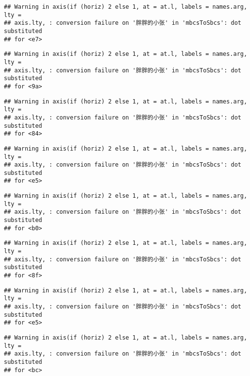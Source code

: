 \documentclass[
]{article}
\begin{document}
\begin{verbatim}
## Warning in axis(if (horiz) 2 else 1, at = at.l, labels = names.arg, lty =
## axis.lty, : conversion failure on '胖胖的小张' in 'mbcsToSbcs': dot substituted
## for <e7>
\end{verbatim}

\begin{verbatim}
## Warning in axis(if (horiz) 2 else 1, at = at.l, labels = names.arg, lty =
## axis.lty, : conversion failure on '胖胖的小张' in 'mbcsToSbcs': dot substituted
## for <9a>
\end{verbatim}

\begin{verbatim}
## Warning in axis(if (horiz) 2 else 1, at = at.l, labels = names.arg, lty =
## axis.lty, : conversion failure on '胖胖的小张' in 'mbcsToSbcs': dot substituted
## for <84>
\end{verbatim}

\begin{verbatim}
## Warning in axis(if (horiz) 2 else 1, at = at.l, labels = names.arg, lty =
## axis.lty, : conversion failure on '胖胖的小张' in 'mbcsToSbcs': dot substituted
## for <e5>
\end{verbatim}

\begin{verbatim}
## Warning in axis(if (horiz) 2 else 1, at = at.l, labels = names.arg, lty =
## axis.lty, : conversion failure on '胖胖的小张' in 'mbcsToSbcs': dot substituted
## for <b0>
\end{verbatim}

\begin{verbatim}
## Warning in axis(if (horiz) 2 else 1, at = at.l, labels = names.arg, lty =
## axis.lty, : conversion failure on '胖胖的小张' in 'mbcsToSbcs': dot substituted
## for <8f>
\end{verbatim}

\begin{verbatim}
## Warning in axis(if (horiz) 2 else 1, at = at.l, labels = names.arg, lty =
## axis.lty, : conversion failure on '胖胖的小张' in 'mbcsToSbcs': dot substituted
## for <e5>
\end{verbatim}

\begin{verbatim}
## Warning in axis(if (horiz) 2 else 1, at = at.l, labels = names.arg, lty =
## axis.lty, : conversion failure on '胖胖的小张' in 'mbcsToSbcs': dot substituted
## for <bc>
\end{verbatim}
\end{document}
